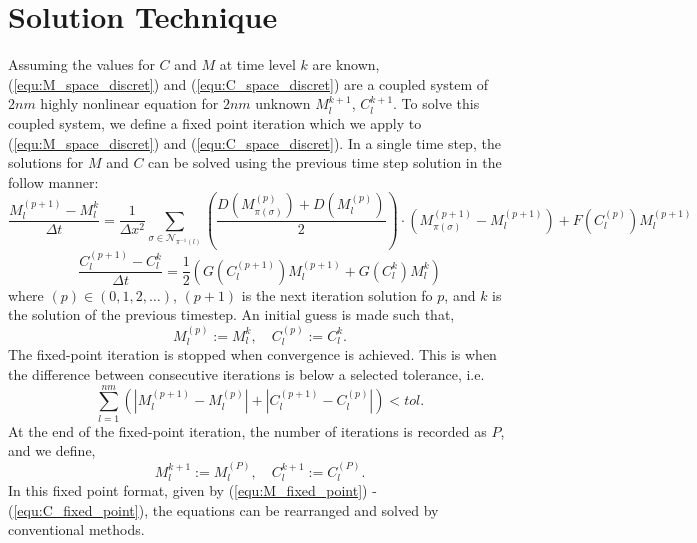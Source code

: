 \section{Solution Technique}

Assuming the values for $C$ and $M$ at time level $k$ are known, (\ref{equ:M_space_discret}) and (\ref{equ:C_space_discret}) are a coupled system of $2nm$ highly nonlinear equation for $2nm$ unknown $M^{k+1}_{l}$, $C^{k+1}_{l}$.
To solve this coupled system, we define a fixed point iteration which we apply to (\ref{equ:M_space_discret}) and (\ref{equ:C_space_discret}).
In a single time step, the solutions for $M$ and $C$ can be solved using the previous time step solution in the follow manner:
\begin{equation} \label{equ:M_fixed_point}
  \frac{M^{(p+1)}_{l} - M^{k}_{l}}{\Delta t} = 
    \frac{1}{\Delta x^2} \sum_{\sigma \in \mathcal{N}_{\pi^{-1}(l)}}
    \left( \frac{D(M^{(p)}_{\pi(\sigma)}) + D(M^{(p)}_{l})}{2} \right)
    \cdot \left( M^{(p+1)}_{\pi(\sigma)} - M^{(p+1)}_{l} \right)
    + F(C^{(p)}_{l}) M^{(p+1)}_{l}
\end{equation}
\begin{equation} \label{equ:C_fixed_point}
  \frac{C^{(p+1)}_{l} - C^{k}_{l}}{\Delta t} = \frac{1}{2} ( G(C^{(p+1)}_{l} ) M^{(p+1)}_{l} + G(C^{k}_{l}) M^{k}_{l} )
\end{equation}
where $(p) \in (0,1,2,\ldots)$, $(p+1)$ is the next iteration solution fo $p$, and $k$ is the solution of the previous timestep.
An initial guess is made such that,
\begin{equation}
  M^{(p)}_{l} := M^{k}_{l}, \quad C^{(p)}_{l} := C^{k}_{l}.
\end{equation}
The fixed-point iteration is stopped when convergence is achieved.
This is when the difference between consecutive iterations is below a selected tolerance, i.e.
\begin{equation} \label{equ:iteration_convergence}
  \sum^{nm}_{l=1} \left( \left| M^{(p+1)}_{l} - M^{(p)}_{l}\right| + \left| C^{(p+1)}_{l} - C^{(p)}_{l} \right| \right) < tol.
\end{equation}
At the end of the fixed-point iteration, the number of iterations is recorded as $P$, and we define,
\begin{equation}
  M^{k+1}_{l} := M^{(P)}_{l}, \quad C^{k+1}_{l} := C^{(P)}_{l}.
\end{equation}
In this fixed point format, given by (\ref{equ:M_fixed_point}) - (\ref{equ:C_fixed_point}), the equations can be rearranged and solved by conventional methods.

